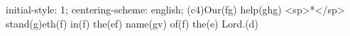 initial-style: 1;
centering-scheme: english;
(c4)Our(fg) help(ghg) <sp>*</sp> stand(g)eth(f) in(f) the(ef) name(gv) of(f) the(e) Lord.(d)
